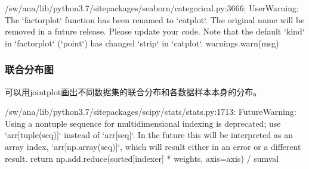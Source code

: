 \documentclass[letterpaper,10pt,english]{sphinxhowto}
\begin{document}
%
\begin{sphinxVerbatim}[commandchars=\\\{\}]
/sw/ana/lib/python3.7/site\PYGZhy{}packages/seaborn/categorical.py:3666: UserWarning: The {}`factorplot{}` function has been renamed to {}`catplot{}`. The original name will be removed in a future release. Please update your code. Note that the default {}`kind{}` in {}`factorplot{}` ({}`\PYGZsq{}point\PYGZsq{}{}`) has changed {}`\PYGZsq{}strip\PYGZsq{}{}` in {}`catplot{}`.
  warnings.warn(msg)
\end{sphinxVerbatim}



\subsubsection{联合分布图}
\label{\detokenize{Seaborn_u6570_u636e_u53ef_u89c6_u5316:id5}}
可以用jointplot画出不同数据集的联合分布和各数据样本本身的分布。

%
\begin{sphinxVerbatim}[commandchars=\\\{\}]
 
       
\end{sphinxVerbatim}

%
\begin{sphinxVerbatim}[commandchars=\\\{\}]
/sw/ana/lib/python3.7/site\PYGZhy{}packages/scipy/stats/stats.py:1713: FutureWarning: Using a non\PYGZhy{}tuple sequence for multidimensional indexing is deprecated; use {}`arr[tuple(seq)]{}` instead of {}`arr[seq]{}`. In the future this will be interpreted as an array index, {}`arr[np.array(seq)]{}`, which will result either in an error or a different result.
  return np.add.reduce(sorted[indexer] * weights, axis=axis) / sumval
\end{sphinxVerbatim}

\end{document}
